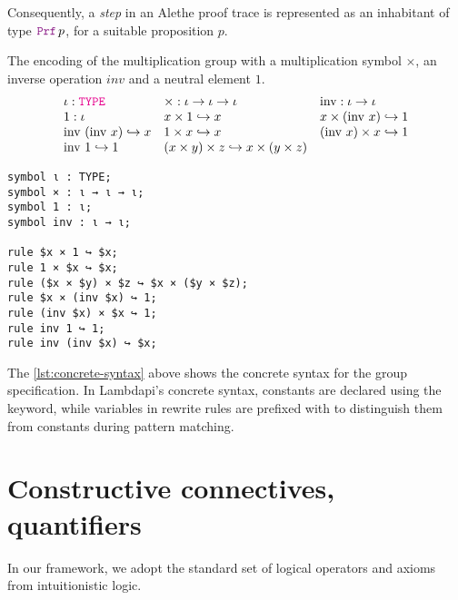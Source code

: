Consequently, a \emph{step} in an Alethe proof trace is represented as an inhabitant of type $\prf{}\,p$, for a suitable proposition $p$.

\begin{example}\label{ex:group}
The encoding of the multiplication group with a multiplication symbol $\times$, an inverse operation $inv$ and a neutral element $1$.
\[
\begin{array}{lll}
\iota : \type & \times : \iota \to \iota \to \iota & \text{inv} : \iota \to \iota \\
1 : \iota & x \times 1 \re x & x \times (\text{inv } x) \re 1 \\
\text{inv } (\text{inv } x) \re x & 1 \times x \re x & (\text{inv } x) \times x \re 1 \\
\text{inv } 1 \re 1 & (x \times y) \times z \re x \times (y \times z) & \\
\end{array}
\]
\end{example}

\begin{lstlisting}[language=Lambdapi,caption={Concrete syntax of \cref{ex:group}}, label={lst:concrete-syntax}]
symbol ι : TYPE;
symbol × : ι → ι → ι;
symbol 1 : ι;
symbol inv : ι → ι;

rule $x × 1 ↪ $x;
rule 1 × $x ↪ $x;
rule ($x × $y) × $z ↪ $x × ($y × $z);
rule $x × (inv $x) ↪ 1;
rule (inv $x) × $x ↪ 1;
rule inv 1 ↪ 1;
rule inv (inv $x) ↪ $x;
\end{lstlisting}

The \cref{lst:concrete-syntax} above shows the concrete syntax for the group specification. In Lambdapi's concrete syntax, constants are declared using the  keyword,
while variables in rewrite rules are prefixed with \kw{\$} to distinguish them from constants during pattern matching.


\section{Constructive connectives, quantifiers}
\label{ssec:encoding-prop}

In our framework, we adopt the standard set of logical operators and axioms from intuitionistic logic.

